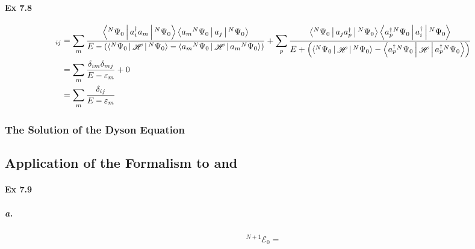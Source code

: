\documentclass[a4paper]{article}
\DeclareMathOperator{\sH}{\mathscr{H}}
\newcommand{\ex}[1]{\paragraph{Ex #1}}
\newcommand{\subex}[1]{\subparagraph{#1}}
\numberwithin{equation}{subsection}
\begin{document}
\ex{7.8}
\begin{align}
[\vb{G}_0(E)]_{ij} &= \sum_m 
\dfrac{\Braket{^N\Psi_0 | a_i^\dagger a_m | ^N\Psi_0} 
	\Braket{a_m {^N\Psi}_0| a_j | ^N\Psi_0}
}{E - \qty(\Braket{^N\Psi_0|\sH |^N\Psi_0} 
- \Braket{a_m {^N\Psi}_0|\sH|a_m {^N\Psi}_0} )}
+ \sum_p
\dfrac{\Braket{^N\Psi_0 | a_j a_p^\dagger | ^N\Psi_0} 
	\Braket{a_p^\dagger {^N\Psi}_0| a_i^\dagger | ^N\Psi_0}
}{E + \qty(\Braket{^N\Psi_0|\sH |^N\Psi_0} 
	- \Braket{a_p^\dagger {^N\Psi}_0|\sH|a_p^\dagger {^N\Psi}_0} )} \notag\\
&= \sum_m \dfrac{\delta_{im}\delta_{mj}}{E - \varepsilon_m} + 0 \notag\\
&= \sum_m \dfrac{\delta_{ij}}{E - \varepsilon_m}
\end{align}

\subsubsection{The Solution of the Dyson Equation}

\subsection{Application of the Formalism to  and }
\ex{7.9}
\subex{a.}
\begin{align}
^{N+1}\mathscr{E}_0 = 
\end{align}
\end{document}
